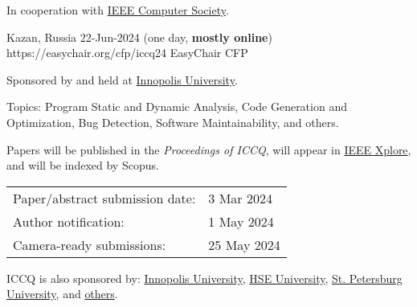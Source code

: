 \documentclass{../cfp}
\begin{document}
\PrintLogo{}



In cooperation
with
\href{https://conferences.ieee.org/conferences_events/conferences/conferencedetails/53703}{IEEE Computer Society}.

\vspace{6pt}

\PrintAddress
  {Kazan, Russia}
  {22-Jun-2024 (one day, \textbf{mostly online})}
  {https://easychair.org/cfp/iccq24}
  {EasyChair CFP}

\vspace{12pt}
%
%
\vspace{12pt}

Sponsored by and held at \href{https://innopolis.university/}{Innopolis University}.

Topics: Program Static and Dynamic Analysis,
Code Generation and Optimization,
Bug Detection, Software Maintainability, and others.

Papers will be published in the \textit{Proceedings of ICCQ},
will appear in \href{https://ieeexplore.ieee.org/Xplore/home.jsp}{IEEE Xplore\textsuperscript{\textregistered}},
and will be indexed by Scopus.

\begin{tabular}{@{}ll}
Paper/abstract submission date: & 3 Mar 2024 \\
Author notification: & 1 May 2024 \\
Camera-ready submissions: & 25 May 2024
\end{tabular}

\vspace{6pt}
ICCQ is also sponsored by:
\href{https://innopolis.university/}{Innopolis University},
\href{https://www.hse.ru/en/}{HSE University},
\href{https://english.spbu.ru/}{St. Petersburg University},
and \href{https://www.iccq.ru/2022.html#partners}{others}.
\end{document}

